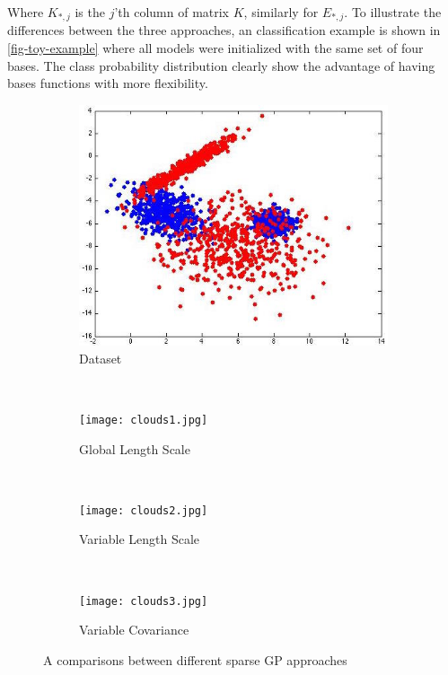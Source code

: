 \documentclass[useAMS,usenatbib,fleqn]{mn2e}
\begin{document}
Where $K_{*,j}$ is the $j$'th column of matrix $K$, similarly for $E_{*,j}$. To illustrate the differences between the three approaches, an classification example is shown in \ref{fig-toy-example} where all models were initialized with the same set of four bases. The class probability distribution clearly show the advantage of having bases functions with more flexibility. 

\begin{figure}
        \centering
        \begin{subfigure}[b]{110 px}
                \includegraphics[width=\textwidth]{clouds.jpg}
                \caption{Dataset}
                \label{fig:dataset}
        \end{subfigure}
        ~
        \begin{subfigure}[b]{110 px}
                \texttt{[image: clouds1.jpg]}
                \caption{Global Length Scale}
                \label{fig:global}
        \end{subfigure}
        ~
        \begin{subfigure}[b]{110 px}
                \texttt{[image: clouds2.jpg]}
                \caption{Variable Length Scale}
                \label{fig:variable-lambda}
        \end{subfigure}
        ~
        \begin{subfigure}[b]{110 px}
                \texttt{[image: clouds3.jpg]}
                \caption{Variable Covariance}
                \label{fig:variable-covariance}
        \end{subfigure}
        \caption{A comparisons between different sparse GP approaches}
        \label{toy-example}
\end{figure}
\end{document}
